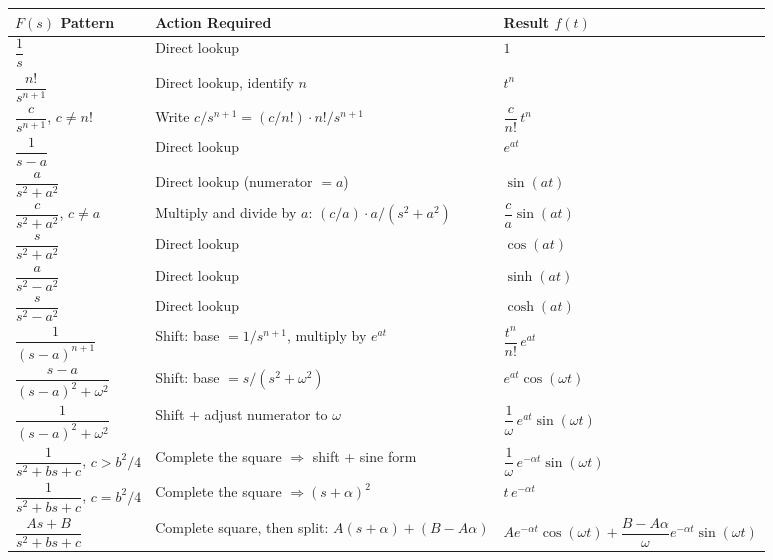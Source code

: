 \documentclass[12pt,a4paper]{article}
\begin{document}
\begin{center}
\begin{tabular}{@{}p{4.5cm}p{4.5cm}p{4.5cm}@{}}
\toprule
\textbf{$F(s)$ Pattern} & \textbf{Action Required} & \textbf{Result $f(t)$} \\
\midrule
$\dfrac{1}{s}$ &
  Direct lookup &
  $1$ \\[8pt]

$\dfrac{n!}{s^{n+1}}$ &
  Direct lookup, identify $n$ &
  $t^n$ \\[8pt]

$\dfrac{c}{s^{n+1}}$, $c \neq n!$ &
  Write $c/s^{n+1} = (c/n!)\cdot n!/s^{n+1}$ &
  $\dfrac{c}{n!}\,t^n$ \\[8pt]

$\dfrac{1}{s-a}$ &
  Direct lookup &
  $e^{at}$ \\[8pt]

$\dfrac{a}{s^2+a^2}$ &
  Direct lookup (numerator $= a$) &
  $\sin(at)$ \\[8pt]

$\dfrac{c}{s^2+a^2}$, $c \neq a$ &
  Multiply and divide by $a$: $(c/a)\cdot a/(s^2+a^2)$ &
  $\dfrac{c}{a}\sin(at)$ \\[8pt]

$\dfrac{s}{s^2+a^2}$ &
  Direct lookup &
  $\cos(at)$ \\[8pt]

$\dfrac{a}{s^2-a^2}$ &
  Direct lookup &
  $\sinh(at)$ \\[8pt]

$\dfrac{s}{s^2-a^2}$ &
  Direct lookup &
  $\cosh(at)$ \\[8pt]

$\dfrac{1}{(s-a)^{n+1}}$ &
  Shift: base $= 1/s^{n+1}$, multiply by $e^{at}$ &
  $\dfrac{t^n}{n!}\,e^{at}$ \\[8pt]

$\dfrac{s-a}{(s-a)^2+\omega^2}$ &
  Shift: base $= s/(s^2+\omega^2)$ &
  $e^{at}\cos(\omega t)$ \\[8pt]

$\dfrac{1}{(s-a)^2+\omega^2}$ &
  Shift + adjust numerator to $\omega$ &
  $\dfrac{1}{\omega}\,e^{at}\sin(\omega t)$ \\[8pt]

$\dfrac{1}{s^2+bs+c}$, $c > b^2/4$ &
  Complete the square $\Rightarrow$ shift + sine form &
  $\dfrac{1}{\omega}\,e^{-\alpha t}\sin(\omega t)$ \\[8pt]

$\dfrac{1}{s^2+bs+c}$, $c = b^2/4$ &
  Complete the square $\Rightarrow (s+\alpha)^2$ &
  $t\,e^{-\alpha t}$ \\[8pt]

$\dfrac{As+B}{s^2+bs+c}$ &
  Complete square, then split: $A(s+\alpha) + (B-A\alpha)$ &
  $Ae^{-\alpha t}\cos(\omega t) + \dfrac{B-A\alpha}{\omega}e^{-\alpha t}\sin(\omega t)$ \\
\bottomrule
\end{tabular}
\end{center}
\end{document}
